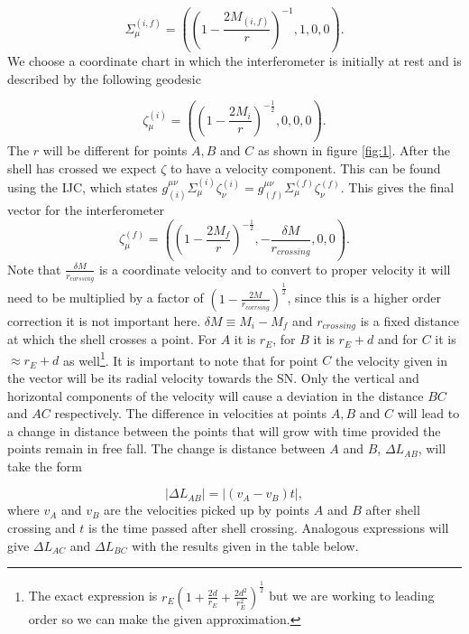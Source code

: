 \documentclass[aps,showpacs,twocolumn,floats,prd,superscriptaddress,nofootinbib]{revtex4-1}
\begin{document}
\begin{equation}
	\Sigma_\mu^{(i,f)} = \left( \left( 1 - \frac{2M_{(i,f)}}{r} \right)^{-1}, 1, 0, 0 \right).
\end{equation}
We choose a coordinate chart in which the interferometer is initially at rest and is described by the following geodesic

\begin{equation}
	\zeta_\mu^{(i)} = \left( \left( 1 - \frac{2M_i}{r} \right)^{-\frac{1}{2}}, 0, 0, 0 \right).
\end{equation}
The $r$ will be different for points $A,B$ and $C$ as shown in figure \ref{fig:1}. After the shell has crossed we expect $\zeta$ to have a velocity component. This can be found using the IJC, which states $g^{\mu \nu}_{(i)} \Sigma_\mu^{(i)} \zeta^{(i)}_\nu = g^{\mu \nu}_{(f)} \Sigma_\mu^{(f)} \zeta^{(f)}_\nu$. This gives the final vector for the interferometer
\begin{equation}
	\zeta_\mu^{(f)} = \left( \left( 1 - \frac{2M_f}{r} \right)^{-\frac{1}{2}}, - \frac{\delta M}{r_{crossing}}, 0, 0 \right).
\end{equation}
Note that $\frac{\delta M}{r_{corssing}}$ is a coordinate velocity and to convert to proper velocity it will need to be multiplied by a factor of $\left( 1 - \frac{2M}{r_{corrsing}} \right)^\frac{1}{2}$, since this is a higher order correction it is not important here. $\delta M \equiv M_i - M_f$ and $r_{crossing}$ is a fixed distance at which the shell crosses a point. For $A$ it is $r_E$, for $B$ it is $r_E + d$ and for $C$ it is $\approx r_E + d$ as well\footnote{The exact expression is $r_E \left( 1 + \frac{2d}{r_E} + \frac{2d^2}{r_E^2} \right)^\frac{1}{2}$ but we are working to leading order so we can make the given approximation.}. It is important to note that for point $C$ the velocity given in the vector will be its radial velocity towards the SN. Only the vertical and horizontal components of the velocity will cause a deviation in the distance $BC$ and $AC$ respectively. The difference in velocities at points $A,B$ and $C$ will lead to a change in distance between the points that will grow with time provided the points remain in free fall. The change is distance between $A$ and $B$, $\Delta L_{AB}$, will take the form

\begin{equation}
	|\Delta L_{AB}| = | (v_A - v_B)t|,
\end{equation}
where $v_A$ and $v_B$ are the velocities picked up by points $A$ and $B$ after shell crossing and $t$ is the time passed after shell crossing. Analogous expressions will give $\Delta L_{AC}$ and $\Delta L_{BC}$ with the results given in the table below.
\end{document}
